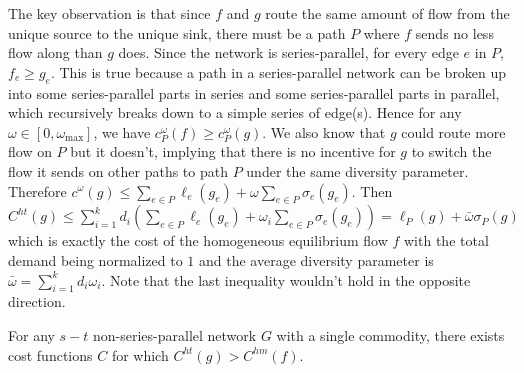 \begin{proof-sketch}

    The key observation is that since $f$ and $g$ route the same amount of flow from the unique source to the unique sink, there must be a path $P$ where $f$ sends no less flow along than $g$ does. Since the network is series-parallel, for every edge $e$ in $P$, $f_e \ge g_e$. This is true because a path in a series-parallel network can be broken up into some series-parallel parts in series and some series-parallel parts in parallel, which recursively breaks down to a simple series of edge(s). Hence for any $\omega\in [0, \omega_{\max}]$, we have $c_P^\omega (f)\ge c_P^\omega(g)$. We also know that $g$ could route more flow on $P$ but it doesn't, implying that there is no incentive for $g$ to switch the flow it sends on other paths to path $P$ under the same diversity parameter. Therefore $c^\omega(g)\le \sum_{e\in P} \ell_e(g_e)+\omega\sum_{e\in P}\sigma_e(g_e)$. Then $C^{ht}(g)\le \sum_{i=1}^k d_i(\sum_{e\in P} \ell_e(g_e)+\omega_i\sum_{e\in P}\sigma_e(g_e))=\ell_P(g)+\bar{\omega}\sigma_P(g)$ which is exactly the cost of the homogeneous equilibrium flow $f$ with the total demand being normalized to $1$ and the average diversity parameter is $\bar{\omega}=\sum_{i=1}^k d_i\omega_i$. Note that the last inequality wouldn't hold in the opposite direction. %
\end{proof-sketch}


\begin{theorem}
For any $s-t$ non-series-parallel network $G$ with a single commodity, there exists cost functions $C$ for which $C^{ht}(g)> C^{hm}(f)$.
\label{diversethm2}
\end{theorem}

